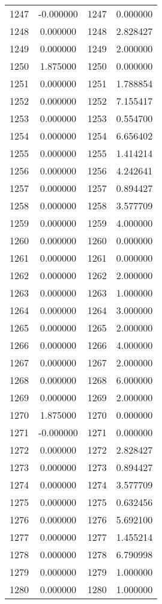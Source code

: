 \documentclass[12pt]{article}
\begin{document}
\begin{longtable}{@{}cccc@{}}
1247 & -0.000000 & 1247 & 0.000000 \\
1248 & 0.000000 & 1248 & 2.828427 \\
1249 & 0.000000 & 1249 & 2.000000 \\
1250 & 1.875000 & 1250 & 0.000000 \\
1251 & 0.000000 & 1251 & 1.788854 \\
1252 & 0.000000 & 1252 & 7.155417 \\
1253 & 0.000000 & 1253 & 0.554700 \\
1254 & 0.000000 & 1254 & 6.656402 \\
1255 & 0.000000 & 1255 & 1.414214 \\
1256 & 0.000000 & 1256 & 4.242641 \\
1257 & 0.000000 & 1257 & 0.894427 \\
1258 & 0.000000 & 1258 & 3.577709 \\
1259 & 0.000000 & 1259 & 4.000000 \\
1260 & 0.000000 & 1260 & 0.000000 \\
1261 & 0.000000 & 1261 & 0.000000 \\
1262 & 0.000000 & 1262 & 2.000000 \\
1263 & 0.000000 & 1263 & 1.000000 \\
1264 & 0.000000 & 1264 & 3.000000 \\
1265 & 0.000000 & 1265 & 2.000000 \\
1266 & 0.000000 & 1266 & 4.000000 \\
1267 & 0.000000 & 1267 & 2.000000 \\
1268 & 0.000000 & 1268 & 6.000000 \\
1269 & 0.000000 & 1269 & 2.000000 \\
1270 & 1.875000 & 1270 & 0.000000 \\
1271 & -0.000000 & 1271 & 0.000000 \\
1272 & 0.000000 & 1272 & 2.828427 \\
1273 & 0.000000 & 1273 & 0.894427 \\
1274 & 0.000000 & 1274 & 3.577709 \\
1275 & 0.000000 & 1275 & 0.632456 \\
1276 & 0.000000 & 1276 & 5.692100 \\
1277 & 0.000000 & 1277 & 1.455214 \\
1278 & 0.000000 & 1278 & 6.790998 \\
1279 & 0.000000 & 1279 & 1.000000 \\
1280 & 0.000000 & 1280 & 1.000000 \\

\end{longtable}
\end{document}
